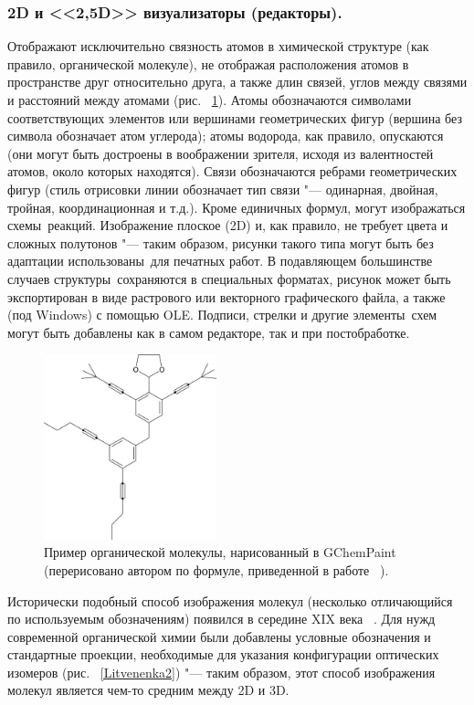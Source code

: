 \documentclass[10pt, a5paper]{article}
\begin{document}
\subsubsection*{2D и <<2,5D>> визуализаторы (редакторы).}

Отображают исключительно связность атомов в \linebreak химической структуре (как правило, органической молекуле), не отображая расположения атомов в пространстве друг относительно друга, а также длин связей, углов между связями и расстояний между атомами (рис. ~\ref{Litvenenka1}). Атомы обозначаются символами соответствующих элементов или вершинами геометрических фигур (вершина без символа обозначает атом углерода); атомы водорода, как правило, опускаются (они могут быть достроены в воображении зрителя, исходя из валентностей атомов, около которых находятся). Связи обозначаются ребрами геометрических фигур (стиль отрисовки линии обозначает тип связи "--- одинарная, двойная, тройная, координационная и т.д.). Кроме единичных формул, могут изображаться схемы реакций. Изображение плоское (2D) и, как правило, не требует цвета и сложных полутонов "--- таким образом, рисунки такого типа могут быть без адаптации использованы для печатных работ. В подавляющем большинстве случаев структуры сохраняются в специальных форматах, рисунок может быть экспортирован в виде растрового или векторного графического файла, а также (под Windows) с помощью OLE. Подписи, стрелки и другие элементы схем могут быть добавлены как в самом редакторе, так и при постобработке.


\begin{figure}[h!]
  \centering
  \includegraphics[width=5cm]{20_2016_Litvenenka1.png}
  \caption{Пример органической молекулы, нарисованный в GChemPaint (перерисовано автором по формуле, приведенной в работе ~\cite{Litvenenka1}).}
  \label{Litvenenka1}
\end{figure}

Исторически подобный способ изображения молекул (несколько отличающийся по используемым обозначениям) появился в середине XIX века ~\cite{Litvenenka2}. Для нужд современной органической химии были добавлены условные обозначения и стандартные проекции, необходимые для указания конфигурации оптических изомеров (рис. ~\ref{Litvenenka2}) "--- таким образом, этот способ изображения молекул является чем-то средним между 2D и 3D.
\end{document}
